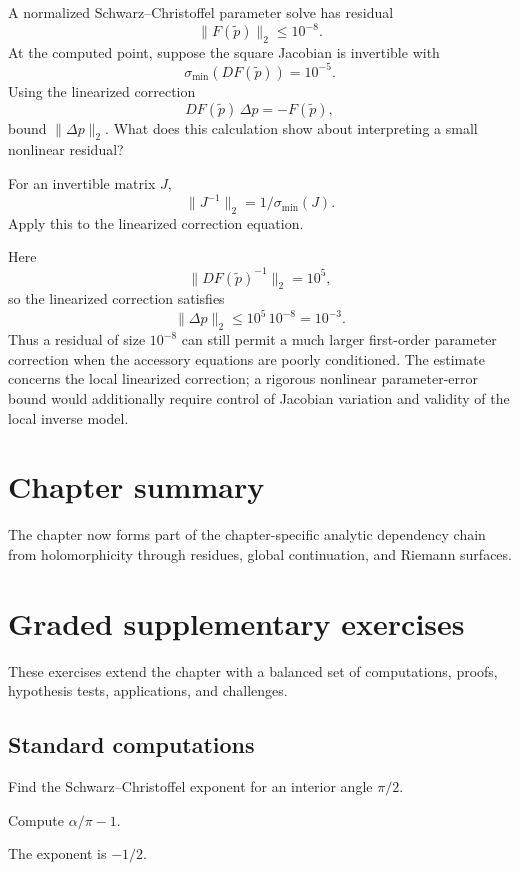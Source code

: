 \begin{exercise}\label{exr:iv18-numerical-sc-01}
A normalized Schwarz--Christoffel parameter solve has residual
\[
\|F(\widetilde p)\|_2\le10^{-8}.
\]
At the computed point, suppose the square Jacobian is invertible with
\[
\sigma_{\min}(DF(\widetilde p))=10^{-5}.
\]
Using the linearized correction
\[
DF(\widetilde p)\,\Delta p=-F(\widetilde p),
\]
bound \(\|\Delta p\|_2\).  What does this calculation show about interpreting a
small nonlinear residual?
\end{exercise}
\begin{hint}
For an invertible matrix \(J\),
\[
\|J^{-1}\|_2=1/\sigma_{\min}(J).
\]
Apply this to the linearized correction equation.
\end{hint}
\begin{solution}
Here
\[
\|DF(\widetilde p)^{-1}\|_2=10^5,
\]
so the linearized correction satisfies
\[
\|\Delta p\|_2
\le
10^5\,10^{-8}
=
10^{-3}.
\]
Thus a residual of size \(10^{-8}\) can still permit a much larger
first-order parameter correction when the accessory equations are poorly
conditioned.  The estimate concerns the local linearized correction; a
rigorous nonlinear parameter-error bound would additionally require control of
Jacobian variation and validity of the local inverse model.
\end{solution}

\section*{Chapter summary}
The chapter now forms part of the chapter-specific analytic dependency chain from holomorphicity through residues, global continuation, and Riemann surfaces.
\section{Graded supplementary exercises}
These exercises extend the chapter with a balanced set of computations, proofs, hypothesis tests, applications, and challenges.

\subsection*{Standard computations}

\begin{exercise}\label{exr:iv18-expand-01}
Find the Schwarz--Christoffel exponent for an interior angle \(\pi/2\).
\end{exercise}
\begin{hint}
Compute \(\alpha/\pi-1\).
\end{hint}
\begin{solution}
The exponent is \(-1/2\).
\end{solution}

